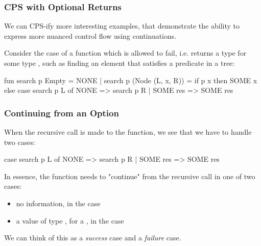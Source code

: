 \documentclass[aspectratio=169, handout]{beamer}
\begin{document}

\begin{frame}[fragile]
  \frametitle{CPS with Optional Returns}

  We can CPS-ify more interesting examples, that demonstrate the
  ability to express more nuanced control flow using continuations.

  \pause
  \vspace{\fill}

  Consider the case of a function which is allowed to fail, i.e.
  returns a type  for some type , such as
  finding an element that satisfies a predicate in a tree:

  \begin{codeblock}
    fun search p Empty = NONE
      | search p (Node (L, x, R)) =
          if p x then
            SOME x
          else
            case search p L of
              NONE => search p R
            | SOME res => SOME res
  \end{codeblock}
\end{frame}

\begin{frame}[fragile]
  \frametitle{Continuing from an Option}

  When the recursive call is made to the function, we see that we have to handle
  two cases:
  \begin{codeblock}
    case search p L of
      NONE => search p R
    | SOME res => SOME res
  \end{codeblock}

  \pause
  \vspace{\fill}

  In essence, the function needs to "continue" from the recursive call in
  one of two cases:
  \begin{itemize}
    \item no information, in the  case \pause
    \item a value of type , for a , in the  case
  \end{itemize}

  \pause
  \vspace{\fill}

  We can think of this as a \textit{success} case and a \textit{failure} case.
\end{frame}
\end{document}
